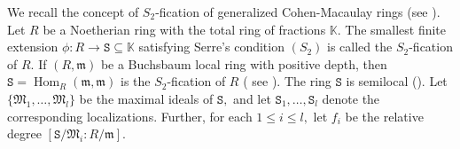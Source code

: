 \documentclass[reqno,a4paper,dvipsnames]{amsart}
\newcommand{\m}{\mathfrak{m} }
\newcommand{\M}{\mathfrak{M}}
\newcommand{\Hom}{\operatorname{Hom}}
\theoremstyle{definition}
\begin{document}
We recall the concept of $S_{2}$-fication of  generalized Cohen-Macaulay rings  (see  \cite[Section 4]{gghv}).  Let $R$ be a Noetherian ring with the total ring of fractions $\mathbb K$. The smallest finite extension $\phi: R\longrightarrow \mathtt S \subseteq \mathbb K$ satisfying Serre's condition $(S_{2})$ is called the $S_{2}$-fication of $R$. 
If  $(R,\m)$ be a Buchsbaum local ring with positive depth,   then $\mathtt S=\Hom_{R}(\m,\m)$ is the $S_{2}$-fication of $R$ ( see \cite[Theorem 4.2]{gghv}). The ring  $\mathtt S$ is semilocal   (\cite[Proposition 4.1(2)]{gghv}). Let $\{\M_{1},\ldots, \M_{l}\}$ be the maximal ideals of $\mathtt S,$ and let $\mathtt S_{1},\ldots,\mathtt S_{l}$ denote the corresponding localizations. Further, for each $1\leq i\leq l,$ let $f_{i}$ be the relative degree $[\mathtt S/\M_{i}:R/\m].$
\end{document}
